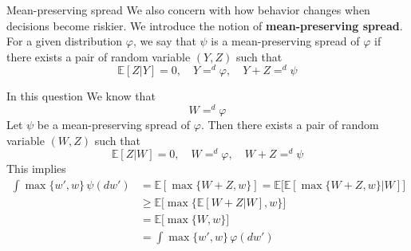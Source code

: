\begin{frame}{Mean-preserving spread}
    We also concern with how behavior changes when decisions become riskier. We introduce the notion of \textbf{mean-preserving spread}. For a given distribution $\varphi$, we say that $\psi$ is a mean-preserving spread of $\varphi$ if there exists a pair of random variable $(Y,Z)$ such that
    $$
    \mathbb{E}[Z|Y] = 0,\quad Y=^d \varphi, \quad Y+Z=^d\psi 
    $$
\end{frame}

\begin{frame}{In this question}
We know that
$$
W =^d \varphi
$$
Let $\psi$ be a mean-preserving spread of $\varphi$. Then there exists a pair of random variable $(W,Z)$ such that
$$
\mathbb{E}[Z|W] = 0,\quad W=^d\varphi, \quad W+Z=^d\psi
$$
This implies
\begin{align*}
    \int\max\{w',w\}\,\psi(dw') &= \mathbb{E}[\max\{W+Z, w\}]= \mathbb{E}\bigg[\mathbb{E}[\max\{W+Z, w\}|W]\bigg]\tag{LIE}\\
    &\ge \mathbb{E}\bigg[\max\{\mathbb{E}[W+Z|W],w\}\bigg]\tag{Cond. Jensen}\\
    &= \mathbb{E}\bigg[\max\{W,w\}\bigg]\tag{Linearity}\\
    &= \int\max\{w',w\}\,\varphi(dw')
\end{align*}
\end{frame}